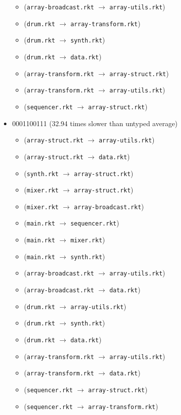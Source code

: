 \documentclass{article}
\newcommand{\mono}[1]{\texttt{#1}}
\begin{document}
\begin{itemize}
\begin{itemize}
  \item (\mono{array-broadcast.rkt} $\rightarrow$ \mono{array-utils.rkt})
  \item (\mono{drum.rkt} $\rightarrow$ \mono{array-transform.rkt})
  \item (\mono{drum.rkt} $\rightarrow$ \mono{synth.rkt})
  \item (\mono{drum.rkt} $\rightarrow$ \mono{data.rkt})
  \item (\mono{array-transform.rkt} $\rightarrow$ \mono{array-struct.rkt})
  \item (\mono{array-transform.rkt} $\rightarrow$ \mono{array-utils.rkt})
  \item (\mono{sequencer.rkt} $\rightarrow$ \mono{array-struct.rkt})
  \end{itemize}
\item 0001100111 (32.94 times slower than untyped average)
  \begin{itemize}
  \item (\mono{array-struct.rkt} $\rightarrow$ \mono{array-utils.rkt})
  \item (\mono{array-struct.rkt} $\rightarrow$ \mono{data.rkt})
  \item (\mono{synth.rkt} $\rightarrow$ \mono{array-struct.rkt})
  \item (\mono{mixer.rkt} $\rightarrow$ \mono{array-struct.rkt})
  \item (\mono{mixer.rkt} $\rightarrow$ \mono{array-broadcast.rkt})
  \item (\mono{main.rkt} $\rightarrow$ \mono{sequencer.rkt})
  \item (\mono{main.rkt} $\rightarrow$ \mono{mixer.rkt})
  \item (\mono{main.rkt} $\rightarrow$ \mono{synth.rkt})
  \item (\mono{array-broadcast.rkt} $\rightarrow$ \mono{array-utils.rkt})
  \item (\mono{array-broadcast.rkt} $\rightarrow$ \mono{data.rkt})
  \item (\mono{drum.rkt} $\rightarrow$ \mono{array-utils.rkt})
  \item (\mono{drum.rkt} $\rightarrow$ \mono{synth.rkt})
  \item (\mono{drum.rkt} $\rightarrow$ \mono{data.rkt})
  \item (\mono{array-transform.rkt} $\rightarrow$ \mono{array-utils.rkt})
  \item (\mono{array-transform.rkt} $\rightarrow$ \mono{data.rkt})
  \item (\mono{sequencer.rkt} $\rightarrow$ \mono{array-struct.rkt})
  \item (\mono{sequencer.rkt} $\rightarrow$ \mono{array-transform.rkt})
  \end{itemize}


\end{itemize}
\end{document}
